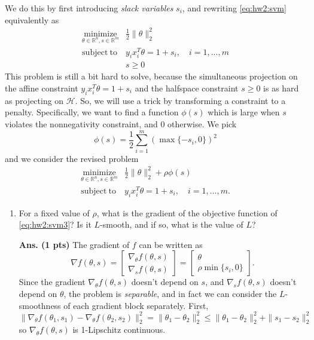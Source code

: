 \documentclass{article}
\newcommand{\minimize}[1]{\underset{#1}{\text{minimize}}}
\newcommand{\R}{\mathbb R}
\newcommand{\mH}{\mathcal H}
\newcommand{\subjto}{\mathrm{subject~to}}
\newcommand{\bmat}{\left[\begin{matrix}}
\newcommand{\emat}{\end{matrix}\right]}
\newcommand{\showsolutionpts}[2]{\textbf{Ans. (#1 pts)} \;#2}
\begin{document}
\begin{enumerate}
We do this by first introducing \emph{slack variables} $s_i$, and rewriting \eqref{eq:hw2:svm} equivalently as
\begin{equation}
\begin{array}{ll}
\minimize{\theta\in \R^n, s\in \R^m} & \frac{1}{2}\|\theta\|_2^2 \\
 \subjto & y_ix_i^T\theta = 1 + s_i, \quad  i = 1,...,m\\
 & s \geq 0
 \end{array}
\label{eq:hw2:svm2}
\end{equation}
This problem is still a bit hard to solve, because the simultaneous projection on the affine constraint $y_ix_i^T\theta = 1 + s_i$ and the halfspace constraint $s \geq 0$ is as hard as projecting on $\mH$. So, we will use a trick by transforming a constraint to a penalty. Specifically, we want to find a function $\phi(s)$ which is large when $s$ violates the nonnegativity constraint, and 0 otherwise. We pick 
\[
\phi(s) = \frac{1}{2}\sum_{i=1}^m (\max\{-s_i, 0\})^2
\]
and we consider the revised problem 
\begin{equation}
\begin{array}{ll}
\minimize{\theta\in \R^n, s\in \R^m} & \frac{1}{2}\|\theta\|_2^2 + \rho \phi(s) \\
 \subjto & y_ix_i^T\theta = 1 + s_i, \quad  i = 1,...,m.
 \end{array}
\label{eq:hw2:svm3}
\end{equation}
\begin{enumerate}



\item For a fixed value of $\rho$, what is the gradient of the objective function of \eqref{eq:hw2:svm3}? Is it $L$-smooth, and if so, what is the value of $L$?

\showsolutionpts{1}{
The gradient of $f$ can be written as 
\[
\nabla f(\theta, s) = \bmat \nabla_\theta f(\theta,s)\\ \nabla_s f(\theta,s) \emat = \bmat \theta \\ \rho \min\{s_i,0\} \emat.
\]
Since the gradient $\nabla_\theta f(\theta,s)$ doesn't depend on $s$, and $\nabla_s f(\theta,s)$ doesn't depend on $\theta$, the problem is \emph{separable}, and in fact we can consider the $L$-smoothness of each gradient block separately. First, 
\[
\|\nabla_\theta f(\theta_1,s_1) - \nabla_\theta f(\theta_2,s_2) \|_2^2 = \|\theta_1-\theta_2\|_2^2 \leq \|\theta_1-\theta_2\|_2^2 + \|s_1-s_2\|_2^2
\]
so $\nabla_\theta f(\theta,s)$ is 1-Lipschitz continuous.

}
\end{enumerate}
\end{enumerate}
\end{document}
